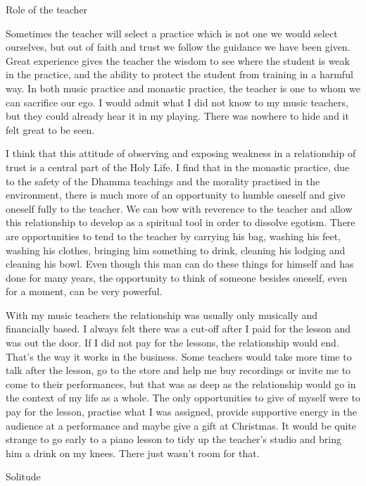Role of the teacher

Sometimes the teacher will select a practice which is not one we would
select ourselves, but out of faith and trust we follow the guidance we
have been given. Great experience gives the teacher the wisdom to see
where the student is weak in the practice, and the ability to protect
the student from training in a harmful way. In both music practice and
monastic practice, the teacher is one to whom we can sacrifice our ego.
I would admit what I did not know to my music teachers, but they could
already hear it in my playing. There was nowhere to hide and it felt
great to be seen.

I think that this attitude of observing and exposing weakness in a
relationship of trust is a central part of the Holy Life. I find that in
the monastic practice, due to the safety of the Dhamma teachings and the
morality practised in the environment, there is much more of an
opportunity to humble oneself and give oneself fully to the teacher. We
can bow with reverence to the teacher and allow this relationship to
develop as a spiritual tool in order to dissolve egotism. There are
opportunities to tend to the teacher by carrying his bag, washing his
feet, washing his clothes, bringing him something to drink, cleaning his
lodging and cleaning his bowl. Even though this man can do these things
for himself and has done for many years, the opportunity to think of
someone besides oneself, even for a moment, can be very powerful.

With my music teachers the relationship was usually only musically and
financially based. I always felt there was a cut-off after I paid for
the lesson and was out the door. If I did not pay for the lessons, the
relationship would end. That's the way it works in the business. Some
teachers would take more time to talk after the lesson, go to the store
and help me buy recordings or invite me to come to their performances,
but that was as deep as the relationship would go in the context of my
life as a whole. The only opportunities to give of myself were to pay
for the lesson, practise what I was assigned, provide supportive energy
in the audience at a performance and maybe give a gift at Christmas. It
would be quite strange to go early to a piano lesson to tidy up the
teacher's studio and bring him a drink on my knees. There just wasn't
room for that.

Solitude

